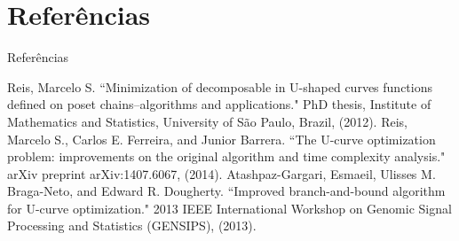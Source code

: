 \documentclass{beamer}
\begin{document}
\section{Referências}
\begin{frame}{Referências}
\begin{thebibliography}{9} \label{sec:referencias}
Reis, Marcelo S. ``Minimization of decomposable in U-shaped curves 
functions defined on poset chains–algorithms and applications." PhD
thesis, Institute of Mathematics and Statistics, University of São 
Paulo, Brazil, (2012).
Reis, Marcelo S., Carlos E. Ferreira, and Junior Barrera. ``The U-curve
optimization problem: improvements on the original algorithm and time
complexity analysis." arXiv preprint arXiv:1407.6067, (2014). 
Atashpaz-Gargari, Esmaeil, Ulisses M. Braga-Neto, and Edward R.
Dougherty. ``Improved branch-and-bound algorithm for U-curve 
optimization." 2013 IEEE International Workshop on Genomic Signal
Processing and Statistics (GENSIPS), (2013).
\end{thebibliography}
\end{frame}
\end{document}
